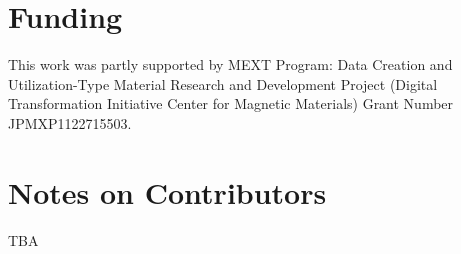 \documentclass[a4paper]{article}
\begin{document}
\section*{Funding}
This work was partly supported by MEXT Program: Data Creation and Utilization-Type Material Research and Development Project (Digital Transformation Initiative Center for Magnetic Materials) Grant Number JPMXP1122715503.


\section*{Notes on Contributors}
TBA






\clearpage

\appendix

\end{document}
